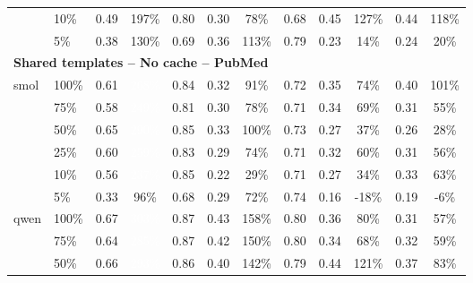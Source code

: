 \begin{longtable}{llcccccccccc}
 & 10\% & 0.49 & \cellcolor{tablegreen!56}197\% & 0.80 & 0.30 & \cellcolor{tablegreen!22}78\% & 0.68 & 0.45 & \cellcolor{tablegreen!36}127\% & 0.44 & \cellcolor{tablegreen!34}118\% \\
 & 5\% & 0.38 & \cellcolor{tablegreen!37}130\% & 0.69 & 0.36 & \cellcolor{tablegreen!32}113\% & 0.79 & 0.23 & \cellcolor{tablegreen!4}14\% & 0.24 & \cellcolor{tablegreen!6}20\% \\
\midrule
\multicolumn{12}{l}{\textbf{Shared templates -- No cache -- PubMed}} \\
\multirow{6}{*}{smol} & 100\% & 0.61 & \cellcolor{tablegreen!77}\textcolor{white}{268\%} & 0.84 & 0.32 & \cellcolor{tablegreen!26}91\% & 0.72 & 0.35 & \cellcolor{tablegreen!21}74\% & 0.40 & \cellcolor{tablegreen!29}101\% \\
 & 75\% & 0.58 & \cellcolor{tablegreen!71}\textcolor{white}{249\%} & 0.81 & 0.30 & \cellcolor{tablegreen!22}78\% & 0.71 & 0.34 & \cellcolor{tablegreen!20}69\% & 0.31 & \cellcolor{tablegreen!16}55\% \\
 & 50\% & 0.65 & \cellcolor{tablegreen!83}\textcolor{white}{290\%} & 0.85 & 0.33 & \cellcolor{tablegreen!29}100\% & 0.73 & 0.27 & \cellcolor{tablegreen!11}37\% & 0.26 & \cellcolor{tablegreen!8}28\% \\
 & 25\% & 0.60 & \cellcolor{tablegreen!74}\textcolor{white}{259\%} & 0.83 & 0.29 & \cellcolor{tablegreen!21}74\% & 0.71 & 0.32 & \cellcolor{tablegreen!17}60\% & 0.31 & \cellcolor{tablegreen!16}56\% \\
 & 10\% & 0.56 & \cellcolor{tablegreen!68}\textcolor{white}{237\%} & 0.85 & 0.22 & \cellcolor{tablegreen!8}29\% & 0.71 & 0.27 & \cellcolor{tablegreen!10}34\% & 0.33 & \cellcolor{tablegreen!18}63\% \\
 & 5\% & 0.33 & \cellcolor{tablegreen!27}96\% & 0.68 & 0.29 & \cellcolor{tablegreen!21}72\% & 0.74 & 0.16 & \cellcolor[HTML]{E8A0A0}-18\% & 0.19 & \cellcolor[HTML]{E8A0A0}-6\% \\
\cmidrule(l){1-12}
\multirow{6}{*}{qwen} & 100\% & 0.67 & \cellcolor{tablegreen!86}\textcolor{white}{303\%} & 0.87 & 0.43 & \cellcolor{tablegreen!45}158\% & 0.80 & 0.36 & \cellcolor{tablegreen!23}80\% & 0.31 & \cellcolor{tablegreen!16}57\% \\
 & 75\% & 0.64 & \cellcolor{tablegreen!81}\textcolor{white}{285\%} & 0.87 & 0.42 & \cellcolor{tablegreen!43}150\% & 0.80 & 0.34 & \cellcolor{tablegreen!19}68\% & 0.32 & \cellcolor{tablegreen!17}59\% \\
 & 50\% & 0.66 & \cellcolor{tablegreen!84}\textcolor{white}{293\%} & 0.86 & 0.40 & \cellcolor{tablegreen!41}142\% & 0.79 & 0.44 & \cellcolor{tablegreen!34}121\% & 0.37 & \cellcolor{tablegreen!24}83\% \\

\end{longtable}
